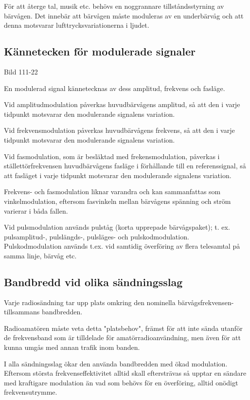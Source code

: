 För att återge tal, musik etc. behövs en noggrannare tillståndsstyrning av bärvågen.
Det innebär att bärvågen måste moduleras av en underbärvåg och att denna motsvarar
lufttrycksvariationerna i ljudet.

\subsection{Kännetecken för modulerade signaler}

Bild 111-22

En modulerad signal kännetecknas av dess amplitud, frekvens och fasläge.

Vid amplitudmodulation påverkas huvudbärvågens amplitud, så att den i varje tidpunkt
motsvarar den modulerande signalens variation.

Vid frekvensmodulation påverkas huvudbärvågens frekvens, så att den i varje tidpunkt
motsvarar den modulerande signalens variation.

Vid fasmodulation, som är besläktad med frekensmodulation, påverkas i ställettörfrekvensen
huvudbärvågens fasläge i förhållande till en referenssignal, så att fasläget i varje
tidpunkt motsvarar den modulerande signalens variation.

Frekvens- och fasmodulation liknar varandra och kan sammanfattas som vinkelmodulation,
eftersom fasvinkeln mellan bärvågens spänning och ström varierar i båda fallen.

Vid pulsmodulation används pulståg (korta upprepade bärvågspaket); t. ex. pulsamplitud-,
pulslängds-, pulsläges- och pulskodmodulation. Pulskodmodulation används t.ex. vid
samtidig överföring av flera telesamtal på samma linje, bärvåg etc.

\subsection{Bandbredd vid olika sändningsslag}

Varje radiosändning tar upp plats omkring den nominella bärvågsfrekvensen- tillsammans
bandbredden.

Radioamatören måste veta detta "platsbehov", främst för att inte sända utanför de
frekvensband som är tilldelade för amatörradioanvändning, men även för att kunna
umgås med annan trafik inom banden.

I alla sändningsslag ökar den använda bandbredden med ökad modulation. Eftersom största
frekvenseffektivitet alltid skall eftersträvas så upptar en sändare med kraftigare
modulation än vad som behövs för en överföring, alltid onödigt frekvensutrymme.

